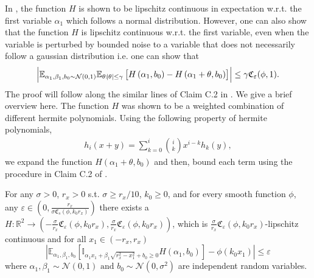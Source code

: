 In \cite{allen2019learning}, the function $H$ is shown to be lipschitz continuous in expectation w.r.t. the first variable $\alpha_1$ which follows a normal distribution. However, one can also show that the function $H$ is lipschitz continuous w.r.t. the first variable, even when the variable is perturbed by bounded noise to a variable that does not necessarily follow a gaussian distribution i.e. one can show that
\begin{align*}
	\left|\mathbb{E}_{\alpha_1, \beta_1, b_0 \sim \mathcal{N}(0, 1)} \mathbb{E}_{\theta: \abs{\theta} \le \gamma} \left[H\left(\alpha_{1}, b_0\right) - H\left(\alpha_{1} + \theta, b_0\right)\right]\right| \le \gamma \mathfrak{C}_\varepsilon(\phi, 1). 
\end{align*}
The proof will follow along the similar lines of Claim C.2 in \cite{allen2019learning}. We give a brief overview here. The function $H$ was shown to be a weighted combination of different hermite polynomials. Using the following property of hermite polynomials,
\begin{align*}
	h_i(x+y) = \sum_{k=0}^{i} {i \choose k} x^{i-k} h_k(y),
\end{align*}
we expand the function $H\left(\alpha_{1} + \theta, b_0\right)$ and then, bound each term using the procedure in Claim C.2 of \cite{allen2019learning}.

\begin{corollary}\label{Cor:Smooth_H}
	For any $\sigma > 0$, $r_x > 0$ s.t. $\sigma \ge r_x/10$, $k_0 \ge 0$, and for every smooth function $\phi$, any $\varepsilon \in \left(0, \frac{r_x}{\sigma \mathfrak{C}_{s}\left(\phi, k_0 r_x\right)}\right)$ there exists a $H:\mathbb{R}^2 \to \left(- 
	\frac{\sigma}{r_x}\mathfrak{C}_\varepsilon\left(\phi,  k_0 r_x\right), \frac{\sigma}{r_x} \mathfrak{C}_\varepsilon\left(\phi,  k_0 r_x\right)\right)$, which is $ \frac{\sigma}{r_x}\mathfrak{C}_\varepsilon\left(\phi, k_0 r_x\right)$-lipschitz continuous and for all $x_1 \in (-r_x, r_x)$
	\begin{equation*}
		\left|\mathbb{E}_{\alpha_1, \beta_1, b_0}\left[\mathbb{I}_{\alpha_{1} x_{1}+\beta_{1} \sqrt{r_x^2-x_{1}^{2}} + b_0   \geq 0} {H\left(\alpha_{1}, b_0\right)}\right]-\phi\left(k_0 x_{1}\right)\right| \leq \varepsilon
	\end{equation*}
	where $\alpha_1, \beta_1 \sim \mathcal{N}\left(0, 1\right) \text{ and } b_0 \sim \mathcal{N}\left(0, \sigma^2\right)$ are independent random variables.
\end{corollary}


